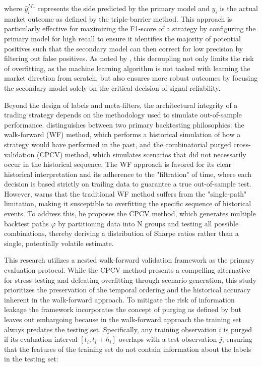 \documentclass[12pt, a4paper]{article}
\begin{document}
where \( \hat{y}_i^{M1} \) represents the side predicted by the primary model and \( y_i \) is the actual market outcome as defined by the triple-barrier method. 
This approach is particularly effective for maximizing the F1-score of a strategy by configuring the primary model for high recall to ensure it 
identifies the majority of potential positives such that the secondary model can then correct for low precision by filtering out false positives. 
As noted by \textcite{lopez_de_prado_advances_2018}, this decoupling not only limits the risk of overfitting, as the machine
learning algorithm is not tasked with learning the market direction from scratch, 
but also ensures more robust outcomes by focusing the secondary model solely on the critical decision of signal reliability.

\medskip

Beyond the design of labels and meta-filters, the architectural integrity of a trading strategy depends on the methodology used to simulate out-of-sample performance. 
\textcite{lopez_de_prado_advances_2018} distinguishes between two primary backtesting philosophies: 
the walk-forward (WF) method, which performs a historical simulation of how a strategy would have performed in the past, 
and the combinatorial purged cross-validation (CPCV) method, which simulates scenarios that did not necessarily occur in the historical sequence. 
The WF approach is favored for its clear historical interpretation and its adherence to the "filtration" of time, 
where each decision is based strictly on trailing data to guarantee a true out-of-sample test. 
However, \textcite{lopez_de_prado_advances_2018} warns that the traditional WF method suffers from the "single-path" limitation, 
making it susceptible to overfitting the specific sequence of historical events. 
To address this, he proposes the CPCV method, which generates multiple backtest paths \( \varphi \) by partitioning data into N groups and testing all possible combinations, 
thereby deriving a distribution of Sharpe ratios rather than a single, potentially volatile estimate.

\medskip

This research utilizes a nested walk-forward validation framework as the primary evaluation protocol. 
While the CPCV method presents a compelling alternative for stress-testing and defeating overfitting through scenario generation,
this study prioritizes the preservation of the temporal ordering and the historical accuracy inherent in the walk-forward approach. 
To mitigate the risk of information leakage the framework incorporates the concept of purging as defined by \textcite{lopez_de_prado_advances_2018} 
but leaves out embargoing because in the walk-forward approach the training set always predates the testing set. 
Specifically, any training observation \( i \) is purged if its evaluation interval \( \left[ t_i, t_i + h_i \right] \) 
overlaps with a test observation \( j \), ensuring that the features of the training set do not contain information about the labels in the testing set:
\end{document}
